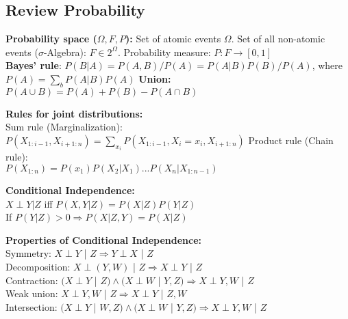 \subsection{Review Probability}
\textbf{Probability space ($\Omega, F, P$):}
Set of atomic events $\Omega$.
Set of all non-atomic events ($\sigma$-Algebra): $F \in 2^{\Omega}$.
Probability measure: $P: F \rightarrow [0,1]$\\
\textbf{Bayes' rule}: $P(B|A)= P(A,B)/P(A)=P(A|B)P(B)/P(A)$, where $P(A)=\sum_bP(A|B)P(A)$
\textbf{Union:} $P(A\cup B)=P(A)+P(B)-P(A\cap B)$


\textbf{Rules for joint distributions:}\\
Sum rule (Marginalization):\\
    $P(X_{1:i-1}, X_{i+1:n})=\sum_{x_i}P(X_{1:i-1}, X_i=x_i, X_{i+1:n})$
Product rule (Chain rule):\\
    $P(X_{1:n})=P(x_1)P(X_2|X_1)...P(X_n|X_{1:n-1})$

\textbf{Conditional Independence:}\\
$X\perp Y | Z $ iff $P(X,Y|Z)=P(X|Z)P(Y|Z)$\\
If $P(Y|Z)>0 \Rightarrow P(X|Z,Y)=P(X|Z)$ 

\textbf{Properties of Conditional Independence:}\\
Symmetry: $X \perp Y$ | $Z \Rightarrow Y \perp X$ | $Z$\\
Decomposition: $X \perp (Y,W)$ | $Z \Rightarrow X \perp Y$ | $Z$\\
Contraction: $(X \perp Y$ | $Z) \wedge (X \perp W$ | $Y, Z) \Rightarrow X \perp Y, W$ | $Z$\\
Weak union: $X \perp Y,W$ | $Z \Rightarrow X \perp Y$ | $Z, W$\\
Intersection: $(X \perp Y$ | $W, Z) \wedge (X \perp W$ | $Y, Z) \Rightarrow X \perp Y, W$ | $Z$
